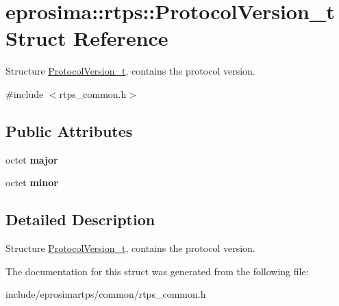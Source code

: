 \hypertarget{structeprosima_1_1rtps_1_1_protocol_version__t}{\section{eprosima\-:\-:rtps\-:\-:\-Protocol\-Version\-\_\-t \-Struct \-Reference}
\label{structeprosima_1_1rtps_1_1_protocol_version__t}
}


\-Structure \hyperlink{structeprosima_1_1rtps_1_1_protocol_version__t}{\-Protocol\-Version\-\_\-t}, contains the protocol version.  




{\ttfamily \#include $<$rtps\-\_\-common.\-h$>$}

\subsection*{\-Public \-Attributes}
\begin{DoxyCompactItemize}
\item 
\hypertarget{structeprosima_1_1rtps_1_1_protocol_version__t_a6bd196539c06534949e47ad19d6017c1}{octet {\bfseries major}}\label{structeprosima_1_1rtps_1_1_protocol_version__t_a6bd196539c06534949e47ad19d6017c1}

\item 
\hypertarget{structeprosima_1_1rtps_1_1_protocol_version__t_aad476efe398fd23f7a3c5ccb276e8cf4}{octet {\bfseries minor}}\label{structeprosima_1_1rtps_1_1_protocol_version__t_aad476efe398fd23f7a3c5ccb276e8cf4}

\end{DoxyCompactItemize}


\subsection{\-Detailed \-Description}
\-Structure \hyperlink{structeprosima_1_1rtps_1_1_protocol_version__t}{\-Protocol\-Version\-\_\-t}, contains the protocol version. 

\-The documentation for this struct was generated from the following file\-:\begin{DoxyCompactItemize}
\item 
include/eprosimartps/common/rtps\-\_\-common.\-h\end{DoxyCompactItemize}
